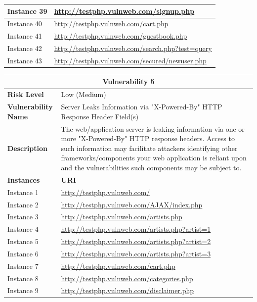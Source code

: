 \documentclass[12pt]{article}
\begin{document}
\begin{center}
\begin{longtable}{|l|p{10cm}|}
\hline
Instance 39 & \url{http://testphp.vulnweb.com/signup.php} \\
\hline
Instance 40 & \url{http://testphp.vulnweb.com/cart.php} \\
\hline
Instance 41 & \url{http://testphp.vulnweb.com/guestbook.php} \\
\hline
Instance 42 & \url{http://testphp.vulnweb.com/search.php?test=query} \\
\hline
Instance 43 & \url{http://testphp.vulnweb.com/secured/newuser.php} \\
\hline
\end{longtable}
\end{center}\vspace{0.7cm}
\begin{center}
\renewcommand{\arraystretch}{1.3}
\begin{longtable}{|l|p{10cm}|}
\hline
\multicolumn{2}{|c|}{\textbf{Vulnerability 5}} \\
\hline
\textbf{Risk Level} & Low (Medium) \\
\hline
\textbf{Vulnerability Name} & Server Leaks Information via "X-Powered-By" HTTP Response Header Field(s) \\
\hline
\textbf{Description} & The web/application server is leaking information via one or more "X-Powered-By" HTTP response headers. Access to such information may facilitate attackers identifying other frameworks/components your web application is reliant upon and the vulnerabilities such components may be subject to. \\
\hline
\textbf{Instances} & \textbf{URI} \\
\hline
Instance 1 & \url{http://testphp.vulnweb.com/} \\
\hline
Instance 2 & \url{http://testphp.vulnweb.com/AJAX/index.php} \\
\hline
Instance 3 & \url{http://testphp.vulnweb.com/artists.php} \\
\hline
Instance 4 & \url{http://testphp.vulnweb.com/artists.php?artist=1} \\
\hline
Instance 5 & \url{http://testphp.vulnweb.com/artists.php?artist=2} \\
\hline
Instance 6 & \url{http://testphp.vulnweb.com/artists.php?artist=3} \\
\hline
Instance 7 & \url{http://testphp.vulnweb.com/cart.php} \\
\hline
Instance 8 & \url{http://testphp.vulnweb.com/categories.php} \\
\hline
Instance 9 & \url{http://testphp.vulnweb.com/disclaimer.php} \\

\end{longtable}
\end{center}
\end{document}
